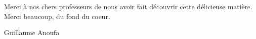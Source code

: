 Merci à nos chers professeurs de nous avoir fait découvrir cette délicieuse
matière. Merci beaucoup, du fond du coeur.

			Guillaume Anoufa
